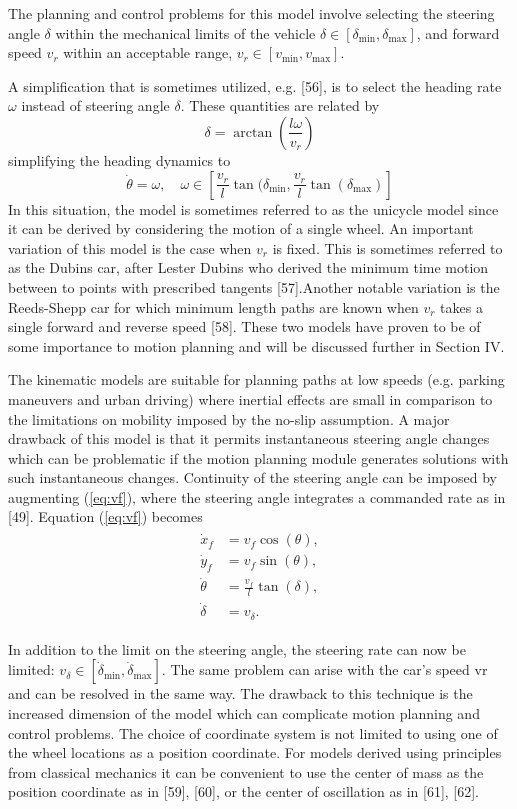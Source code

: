 The planning and control problems for this model involve selecting the steering angle $\delta$ within the mechanical limits of the vehicle $\delta\in [\delta_{\min}, \delta_{\max}]$, and forward speed $v_r$ within an acceptable range, $v_r\in [v_{\min}, v_{\max}]$.

A simplification that is sometimes utilized, e.g. [56], is to select the heading rate $\omega$ instead of steering angle $\delta$. These quantities are related by
\begin{equation}
\delta=\arctan(\frac{l\omega}{v_r})
\end{equation}
simplifying the heading dynamics to
\begin{equation}
\dot{\theta}=\omega, \quad \omega\in [\frac{v_r}{l}\tan(\delta_{\min}, \frac{v_r}{l}\tan(\delta_{\max})]
\end{equation}
In this situation, the model is sometimes referred to as the unicycle model since it can be derived by considering the motion of a single wheel. An important variation of this model is the case when $v_r$ is fixed. This is sometimes referred to as the Dubins car, after Lester Dubins who derived the minimum time motion between to points with prescribed tangents [57].Another notable variation is the Reeds-Shepp car for which minimum length paths are known when $v_r$ takes a single forward and reverse speed [58]. These two models have proven to be of some importance to motion planning and will be discussed further in Section IV.

The kinematic models are suitable for planning paths at low speeds (e.g. parking maneuvers and urban driving) where inertial effects are small in comparison to the limitations on mobility imposed by the no-slip assumption. A major drawback of this model is that it permits instantaneous steering angle changes which can be problematic if the motion planning module generates solutions with such instantaneous changes. Continuity of the steering angle can be imposed by augmenting (\ref{eq:vf}), where the steering angle integrates a commanded rate as in [49]. Equation (\ref{eq:vf}) becomes
\begin{align}
\begin{split}
\dot{x}_f&= v_f\cos(\theta),\\
\dot{y}_f&= v_f\sin(\theta),\\
\dot{\theta}&=\frac{v_f}{l}\tan(\delta),\\
\dot{\delta}&=v_{\delta}.
\end{split}
\end{align}

In addition to the limit on the steering angle, the steering rate can now be limited: $v_{\delta}\in [\dot{\delta}_{\min},\dot{\delta}_{\max}]$. The same problem can arise with the car’s speed vr and can be resolved in the same way. The drawback to this technique is the increased dimension of the model which can complicate motion planning and control problems. The choice of coordinate system is not limited to using one of the wheel locations as a position coordinate. For models derived using principles from classical mechanics it can be convenient to use the center of mass as the position coordinate as in [59], [60], or the center of oscillation as in [61], [62].